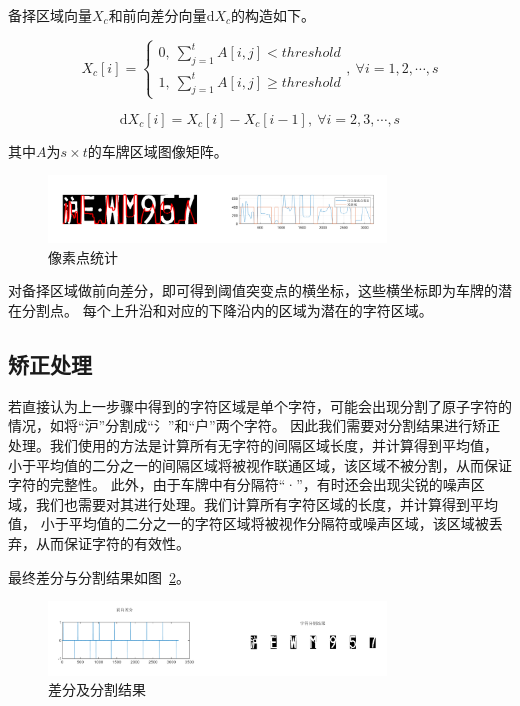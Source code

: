 \documentclass[utf8,a4paper]{ctexart}
\begin{document}
备择区域向量$X_c$和前向差分向量${\mathrm d} X_c$的构造如下。

\begin{equation}
    X_c[i] =
    \begin{cases}
        0,\  \sum_{j=1}^tA[i,j] <threshold \\
        1,\  \sum_{j=1}^tA[i,j] \geq threshold
    \end{cases},\ \forall i=1,2,\cdots,s
\end{equation}

\begin{equation}
    {\mathrm d} X_c[i] = X_c[i]-X_c[i-1],\ \forall i=2,3,\cdots,s
\end{equation}

其中$A$为$s\times t$的车牌区域图像矩阵。

\begin{figure}[h]
    \centering
    \includegraphics[width=0.8\textwidth]{./img/easy/双图.png}
    \caption{像素点统计}
    \label{fig:pixel_count}
\end{figure}

对备择区域做前向差分，即可得到阈值突变点的横坐标，这些横坐标即为车牌的潜在分割点。
每个上升沿和对应的下降沿内的区域为潜在的字符区域。

\subsection{矫正处理}
若直接认为上一步骤中得到的字符区域是单个字符，可能会出现分割了原子字符的情况，如将``沪''分割成``氵''和``户''两个字符。
因此我们需要对分割结果进行矫正处理。我们使用的方法是计算所有无字符的间隔区域长度，并计算得到平均值，
小于平均值的二分之一的间隔区域将被视作联通区域，该区域不被分割，从而保证字符的完整性。
此外，由于车牌中有分隔符``·''，有时还会出现尖锐的噪声区域，我们也需要对其进行处理。我们计算所有字符区域的长度，并计算得到平均值，
小于平均值的二分之一的字符区域将被视作分隔符或噪声区域，该区域被丢弃，从而保证字符的有效性。

最终差分与分割结果如图~\ref{fig:split_result}。

\begin{figure}[h]
    \centering
    \includegraphics[width=0.8\textwidth]{./img/easy/双图2.png}
    \caption{差分及分割结果}
    \label{fig:split_result}
\end{figure}
\end{document}
